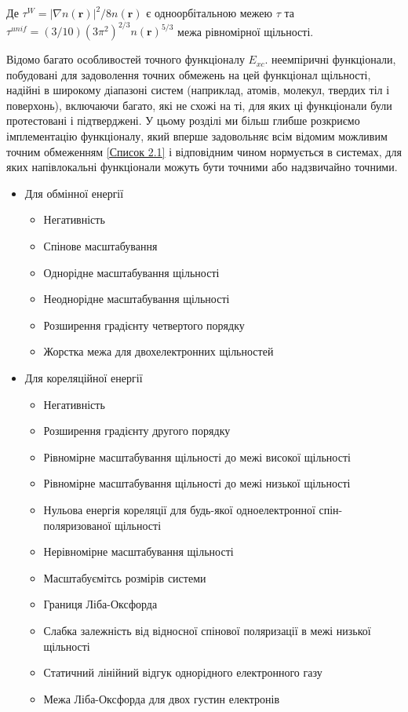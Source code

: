 Де $\tau^W = |\nabla{n(\textbf{r})}|^2/8n(\textbf{r})$ є одноорбітальною межею $\tau$ \newline та $\tau^{unif} = (3/10)(3\pi^2)^{2/3}n(\textbf{r})^{5/3}$ межа рівномірної щільності.

Відомо багато особливостей точного функціоналу $E_{xc}$. неемпіричні функціонали, побудовані для задоволення точних обмежень на цей функціонал щільності, надійні в широкому діапазоні систем (наприклад, атомів, молекул, твердих тіл і поверхонь), включаючи багато, які не схожі на ті, для яких ці функціонали були протестовані і підтверджені. У цьому розділі ми більш глибше розкриємо імплементацію функціоналу, який вперше задовольняє всім відомим можливим точним обмеженням \hyperref[lst:Constrains]{[Список 2.1]} і відповідним чином нормується в системах, для яких напівлокальні функціонали можуть бути точними або надзвичайно точними.

\begin{itemize}	
\label{lst:Constrains}
   \item Для обмінної енергії
   \begin{itemize}
     \item Негативність 
     \item Спінове масштабування
     \item Однорідне масштабування щільності
     \item Неоднорідне масштабування щільності
     \item Розширення градієнту четвертого порядку
     \item Жорстка межа для двохелектронних щільностей
   \end{itemize}
   \item Для кореляційної енергії
   \begin{itemize}
   	  \item Негативність
   	  \item Розширення градієнту другого порядку
   	  \item Рівномірне масштабування щільності до межі високої щільності
   	  \item Рівномірне масштабування щільності до межі низької щільності
   	  \item Нульова енергія кореляції для будь-якої одноелектронної спін-поляризованої щільності
   	  \item Нерівномірне масштабування щільності
   	  \item Масштабуємітсь розмірів системи
   	  \item Границя Ліба-Оксфорда
   	  \item Слабка залежність від відносної спінової поляризації в межі низької щільності
   	  \item Статичний лінійний відгук однорідного електронного газу
   	  \item Межа Ліба-Оксфорда для двох густин електронів
   	\end{itemize}
 \end{itemize}

